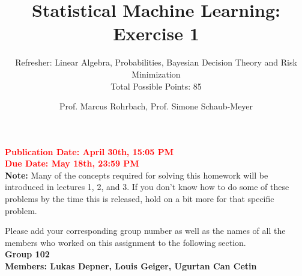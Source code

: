 \documentclass[
	english,
        solution=true
	]{tudaexercise}
\begin{document}
\author{Prof. Marcus Rohrbach, Prof. Simone Schaub-Meyer}

\title[Statistical Machine Learning Exercise 1]{\LARGE Statistical Machine Learning: Exercise 1}
\subtitle{Refresher: Linear Algebra, Probabilities, Bayesian Decision Theory and Risk Minimization\\ Total Possible Points: 85}

\maketitle

\textcolor{red}{\textbf{Publication Date: April 30th, 15:05 PM}}\\
\textcolor{red}{\textbf{Due Date: May 18th, 23:59 PM}}\\

\textbf{Note:} Many of the concepts required for solving this homework will be
introduced in lectures 1, 2, and 3. If you don't know how to do some of these
problems by the time this is released, hold on a bit more for that specific problem. 

Please add your corresponding group number as well as the names of all the members who worked on this assignment to the following section.\\
\textbf{Group 102}\\
\textbf{Members: Lukas Depner, Louis Geiger, Ugurtan Can Cetin}
\end{document}
